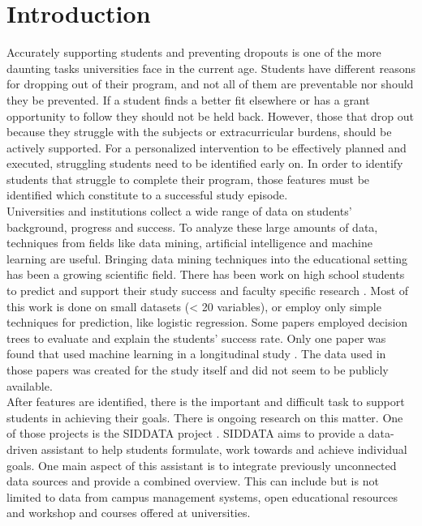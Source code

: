 
\section{Introduction}
Accurately supporting students and preventing dropouts is one of the more daunting tasks universities face in the current age. Students have different reasons for dropping out of their program, and not all of them are preventable nor should they be prevented. If a student finds a better fit elsewhere or has a grant opportunity to follow they should not be held back. However, those that drop out because they struggle with the subjects or extracurricular burdens, should be actively supported. For a personalized intervention to be effectively planned and executed, struggling students need to be identified early on. In order to identify students that struggle to complete their program, those features must be identified which constitute to a successful study episode.\\
Universities and institutions collect a wide range of data on students' background, progress and success. To analyze these large amounts of data, techniques from fields like data mining, artificial intelligence and machine learning are useful. Bringing data mining techniques into the educational setting has been a growing scientific field\cite{Romero.2013}. There has been work on high school students to predict and support their study success \cite{Kaplan.1997, Tamhane.2014, Lakkaraju.2015} and faculty specific research \cite{Kovacic.2012, Nikolovski.April2015}. Most of this work is done on small datasets (< 20 variables), or employ only simple techniques for prediction, like logistic regression. Some papers employed decision trees to evaluate and explain the students' success rate. Only one paper was found that used machine learning in a longitudinal study \cite{Tamhane.2014}. The data used in those papers was created for the study itself and did not seem to be publicly available.\\
After features are identified, there is the important and difficult task to support students in achieving their goals. There is ongoing research on this matter. One of those projects is the SIDDATA project \cite{Osada.2019}. SIDDATA aims to provide a data-driven assistant to help students formulate, work towards and achieve individual goals. One main aspect of this assistant is to integrate previously unconnected data sources and provide a combined overview. This can include but is not limited to data from campus management systems, open educational resources and workshop and courses offered at universities.

